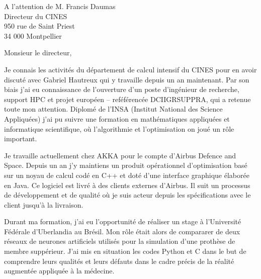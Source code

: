 \documentclass[10pt,a4paper]{lettre}
\begin{document}
\begin{letter}{A l'attention de M. Francis Daumas\\Directeur du CINES\\950 rue de Saint Priest\\34 000 Montpellier}
\address{Victor Cameo Ponz\\16 rue Peyras\\31000 Toulouse}
\nofax

\opening{Monsieur le directeur,}

{
Je connais les activités du département de calcul intensif du CINES pour en
avoir discuté avec Gabriel Hautreux qui y travaille depuis un an
maintenant.
Par son biais j'ai eu connaissance de l'ouverture d'un poste d'ingénieur de recherche,
support HPC et projet européen -- reféférencée DCIIGRSUPPRA,
qui a retenue toute mon attention.
Diplomé de l'INSA (Institut National des Science Appliquées) j'ai pu suivre
une formation en mathématiques appliquées et informatique scientifique, où
l'algorithmie et l'optimisation on joué un rôle important. %
}

{
Je travaille
actuellement chez AKKA pour le compte d'Airbus Defence and Space.
Depuis un an j'y maintiens un produit opérationnel d'optimisation
basé sur un noyau de calcul codé en C++ et doté d'une interface graphique élaborée en Java.
Ce logiciel est livré à des clients externes d'Airbus. Il suit un
processus de développement et de qualité où
je suis acteur depuis les spécifications avec le client jusqu'à la livraison.


Durant ma formation, j'ai eu l'opportunité de réaliser un stage à
l'Université Fédérale d'Uberlandia au Brésil.
Mon rôle était alors de compararer de deux réseaux de neurones
artificiels utilisés pour la simulation d'une prothèse de membre
suppérieur.
J'ai mis en situation les codes Python et C dans le but de comprendre
leurs qualités et leurs défauts dans le cadre précis de la réalité
augmentée appliquée à la médecine. %

}
\end{letter}
\end{document}
